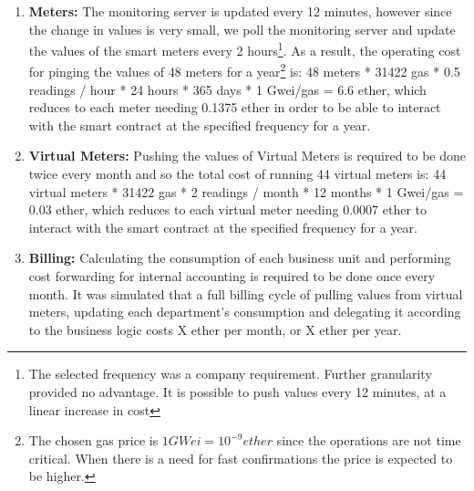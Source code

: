 \begin{enumerate}
    \item \textbf{Meters:} The monitoring server is updated every 12 minutes, however since the change in values is very small, we poll the monitoring server and update the values of the smart meters every 2 hours\footnote{The selected frequency was a company requirement. Further granularity provided no advantage. It is possible to push values every 12 minutes, at a linear increase in cost}. As a result, the operating cost for pinging the values of 48 meters for a year\footnote{The chosen gas price is $1 GWei = 10^{-9} ether$ since the operations are not time critical. When there is a need for fast confirmations the price is expected to be higher.} is: 48 meters * 31422 gas * 0.5 readings / hour * 24 hours * 365 days * 1 Gwei/gas  = 6.6 ether, which reduces to each meter needing 0.1375 ether in order to be able to interact with the smart contract at the specified frequency for a year. 
    \item \textbf{Virtual Meters:} Pushing the values of Virtual Meters is required to be done twice every month and so the total cost of running 44 virtual meters is: 44 virtual meters * 31422 gas * 2 readings / month * 12 months * 1 Gwei/gas  = 0.03 ether, which reduces to each virtual meter needing 0.0007 ether to interact with the smart contract at the specified frequency for a year. 
    \item \textbf{Billing:} Calculating the consumption of each business unit and performing cost forwarding for internal accounting is required to be done once every month. It was simulated that a full billing cycle of pulling values from virtual meters, updating each department's consumption and delegating it according to the business logic costs X ether per month, or X ether per year. 
\end{enumerate}
